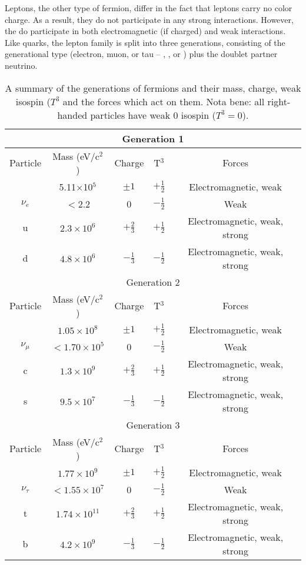 Leptons, the other type of fermion, differ in the fact that leptons carry no
color charge. As a result, they do not participate in any strong interactions.
However, the do participate in both electromagnetic (if charged) and weak
interactions. Like quarks, the lepton family is split into three generations,
consisting of the generational type (electron, muon, or tau -- \E, \M, or \T)
plus the doublet partner neutrino. 

\begin{table}[h]
\centering
\begin{tabular}{|c|c|c|c|c|}
\hline
\multicolumn{5}{|c|}{Generation 1} \\
\hline
Particle & Mass (eV/c$^2$) & Charge & T$^{3}$ & Forces\\
\hline
\E          &  5.11$\times$10$^5$   & $\pm 1$        & $+\frac{1}{2}$   & Electromagnetic, weak\\
$\nu_{e}$   &  $<$2.2               & 0              & $-\frac{1}{2}$   & Weak\\
u           &  $2.3\times10^6$      & $+\frac{2}{3}$ & $+\frac{1}{2}$   & Electromagnetic, weak, strong\\
d           &  $4.8\times10^6$      & $-\frac{1}{3}$ & $-\frac{1}{2}$   & Electromagnetic, weak, strong\\
\hline
\hline
\multicolumn{5}{|c|}{Generation 2} \\
\hline
Particle & Mass (eV/c$^2$) & Charge & T$^{3}$ & Forces\\
\hline
\M          & $1.05 \times10^8$     & $\pm 1$           & $+\frac{1}{2}$ & Electromagnetic, weak\\
$\nu_{\mu}$ & $< 1.70\times10^5$    & 0                 & $-\frac{1}{2}$ & Weak\\
c           & $1.3\times10^9$       & $+\frac{2}{3}$    & $+\frac{1}{2}$ & Electromagnetic, weak, strong\\
s           & $9.5\times10^7$       & $-\frac{1}{3}$    & $-\frac{1}{2}$ & Electromagnetic, weak, strong\\
\hline
\hline
\multicolumn{5}{|c|}{Generation 3} \\
\hline
Particle & Mass (eV/c$^2$) & Charge & T$^{3}$ & Forces\\
\hline
\T          & $1.77\times10^9$      & $\pm 1$           & $+\frac{1}{2}$ & Electromagnetic, weak\\
$\nu_{\tau}$& $< 1.55\times10^7$    & 0                 & $-\frac{1}{2}$ & Weak\\
t           & $1.74\times10^{11}$   & $+\frac{2}{3}$    & $+\frac{1}{2}$ & Electromagnetic, weak, strong\\
b           & $4.2\times10^9$       & $-\frac{1}{3}$    & $-\frac{1}{2}$ & Electromagnetic, weak, strong\\
\hline
\end{tabular}
\caption[Fermions and their properties.]{A summary of the generations of fermions and their mass, charge, weak
isospin ($T^{3}$ and the forces which act on them. Nota bene: all right-handed
particles have weak 0 isospin ($T^{3}=0$).}
\label{tab:fermions}
\end{table}

